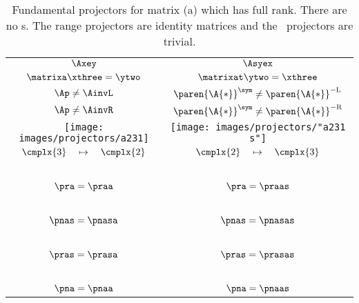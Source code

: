 \clearpage
\begin{table}[htdp]
\caption[Fundamental projectors for matrix (a)]{Fundamental projectors for matrix (a) which has full rank. There are no \ns s. The range projectors are identity matrices and the \ns \ projectors are trivial.}
\begin{center}
\begin{tabular}{cc}
%
  $\Axey$ & $\Asyex$\\
%
  $\matrixa  \xthree = \ytwo$ &
  $\matrixat \ytwo   = \xthree$ \\[15pt]
%
$\Ap \ne \AinvL$ & $\paren{\A{*}}^{\sym} \ne \paren{\A{*}}^{-\mathrm{L}} $ \\
$\Ap \ne \AinvR$ & $\paren{\A{*}}^{\sym} \ne \paren{\A{*}}^{-\mathrm{R}} $ \\
%
\texttt{[image: images/projectors/a231]} &
\texttt{[image: images/projectors/"a231 s"]} \\
%
 $\cmplx{3} \quad \mapsto \quad \cmplx{2}$ & 
 $\cmplx{2} \quad \mapsto \quad \cmplx{3}$\\[5pt]\hline
\ \\
 $\pra  = \praa$  & $\pra  = \praas$ \\
\ \\
 $\pnas = \pnasa$ & $\pnas = \pnasas$ \\
\ \\
 $\pras = \prasa$ & $\pras = \prasas$ \\
\ \\
 $\pna  = \pnaa$  & $\pna  = \pnaas$
%
\end{tabular}
\end{center}
\label{tab:projector summary:a}
\end{table}

\endinput